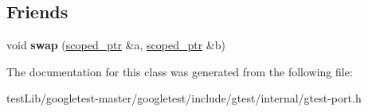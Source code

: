 \subsection*{Friends}
\begin{DoxyCompactItemize}
\item 
\mbox{\label{classtesting_1_1internal_1_1scoped__ptr_a01bc0441e6a3ebf26807ac523392ca86}} 
void {\bfseries swap} (\hyperlink{classtesting_1_1internal_1_1scoped__ptr}{scoped\+\_\+ptr} \&a, \hyperlink{classtesting_1_1internal_1_1scoped__ptr}{scoped\+\_\+ptr} \&b)
\end{DoxyCompactItemize}


The documentation for this class was generated from the following file\+:\begin{DoxyCompactItemize}
\item 
test\+Lib/googletest-\/master/googletest/include/gtest/internal/gtest-\/port.\+h\end{DoxyCompactItemize}

